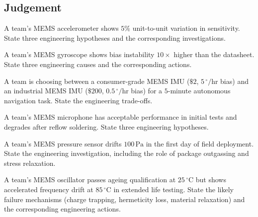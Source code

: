 \subsection*{Judgement}

\begin{exercise}
A team's MEMS accelerometer shows $5\%$ unit-to-unit variation in sensitivity. State three engineering hypotheses and the corresponding investigations.
\end{exercise}

\begin{exercise}
A team's MEMS gyroscope shows bias instability $10\times$ higher than the datasheet. State three engineering causes and the corresponding actions.
\end{exercise}

\begin{exercise}
A team is choosing between a consumer-grade MEMS IMU ($\$2$, $5\,^\circ/\text{hr}$ bias) and an industrial MEMS IMU ($\$200$, $0.5\,^\circ/\text{hr}$ bias) for a $5$-minute autonomous navigation task. State the engineering trade-offs.
\end{exercise}

\begin{exercise}
A team's MEMS microphone has acceptable performance in initial tests and degrades after reflow soldering. State three engineering hypotheses.
\end{exercise}

\begin{exercise}
A team's MEMS pressure sensor drifts $100\,\text{Pa}$ in the first day of field deployment. State the engineering investigation, including the role of package outgassing and stress relaxation.
\end{exercise}

\begin{exercise}
A team's MEMS oscillator passes ageing qualification at $25\,^\circ\text{C}$ but shows accelerated frequency drift at $85\,^\circ\text{C}$ in extended life testing. State the likely failure mechanisms (charge trapping, hermeticity loss, material relaxation) and the corresponding engineering actions.
\end{exercise}
